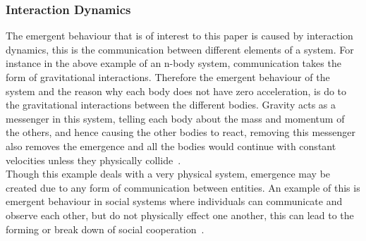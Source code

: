 \documentclass{article}
\begin{document}
\subsubsection{Interaction Dynamics}
The emergent behaviour that is of interest to this paper is caused by interaction dynamics, this is the communication between different elements of a system. For instance in the above example of an n-body system, communication takes the form of gravitational interactions. Therefore the emergent behaviour of the system and the reason why each body does not have zero acceleration, is do to the gravitational interactions between the different bodies.  Gravity acts as a messenger in this system, telling each body about the mass and momentum of the others, and hence causing the other bodies to react, removing this messenger also removes the emergence and all the bodies would continue with constant velocities unless they physically collide~\cite{newtonconstantvelocity}.\\
Though this example deals with a very physical system, emergence may be created due to any form of communication between entities. An example of this is emergent behaviour in social systems where individuals can communicate and observe each other, but do not physically effect one another, this can lead to the forming or break down of social cooperation~\cite{socialemrgence}.
\end{document}
